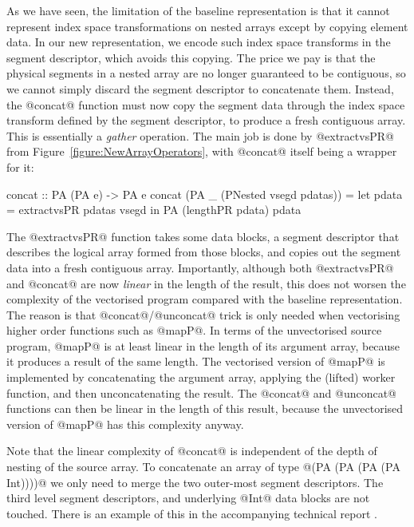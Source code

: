 As we have seen, the limitation of the baseline representation is that it cannot represent index space transformations on nested arrays except by copying element data. In our new representation, we encode such index space transforms in the segment descriptor, which avoids this copying. The price we pay is that the physical segments in a nested array are no longer guaranteed to be contiguous, so we cannot simply discard the segment descriptor to concatenate them. Instead, the @concat@ function must now copy the segment data through the index space transform defined by the segment descriptor, to produce a fresh contiguous array. This is essentially a \emph{gather} operation. The main job is done by @extractvsPR@ from Figure~\ref{figure:NewArrayOperators}, with @concat@ itself being a wrapper for it:
\par
\begin{small}
\begin{code}
 concat :: PA (PA e) -> PA e
 concat (PA _ (PNested vsegd pdatas))
  = let  pdata   = extractvsPR pdatas vsegd
    in   PA (lengthPR pdata) pdata
\end{code}
\end{small}
\par
The @extractvsPR@ function takes some data blocks, a segment descriptor that describes the logical array formed from those blocks, and copies out the segment data into a fresh contiguous array. Importantly, although both @extractvsPR@ and @concat@ are now \emph{linear} in the length of the result, this does not worsen the complexity of the vectorised program compared with the baseline representation. The reason is that @concat@/@unconcat@ trick is only needed when vectorising higher order functions such as @mapP@. In terms of the unvectorised source program, @mapP@ is at least linear in the length of its argument array, because it produces a result of the same length. The vectorised version of @mapP@ is implemented by concatenating the argument array, applying the (lifted) worker function, and then unconcatenating the result. The @concat@ and @unconcat@ functions can then be linear in the length of this result, because the unvectorised version of @mapP@ has this complexity anyway. 

Note that the linear complexity of @concat@ is independent of the depth of nesting of the source array. To concatenate an array of type @(PA (PA (PA (PA Int))))@ we only need to merge the two outer-most segment descriptors. The third level segment descriptors, and underlying @Int@ data blocks are not touched. There is an example of this in the accompanying technical report \cite{lippmeier-etal:replicate-tr}.

